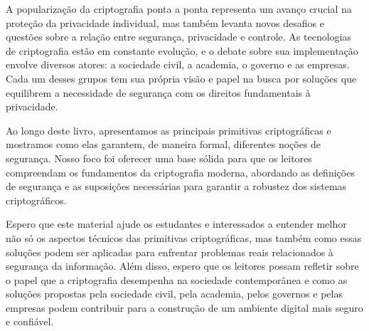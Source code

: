 A popularização da criptografia ponta a ponta representa um avanço crucial na proteção da privacidade individual, mas também levanta novos desafios e questões sobre a relação entre segurança, privacidade e controle.
As tecnologias de criptografia estão em constante evolução, e o debate sobre sua implementação envolve diversos atores: a sociedade civil, a academia, o governo e as empresas.
Cada um desses grupos tem sua própria visão e papel na busca por soluções que equilibrem a necessidade de segurança com os direitos fundamentais à privacidade.


Ao longo deste livro, apresentamos as principais primitivas criptográficas e mostramos como elas garantem, de maneira formal, diferentes noções de segurança.
Nosso foco foi oferecer uma base sólida para que os leitores compreendam os fundamentos da criptografia moderna, abordando as definições de segurança e as suposições necessárias para garantir a robustez dos sistemas criptográficos.

Espero que este material ajude os estudantes e interessados a entender melhor não só os aspectos técnicos das primitivas criptográficas, mas também como essas soluções podem ser aplicadas para enfrentar problemas reais relacionados à segurança da informação.
Além disso, espero que os leitores possam refletir sobre o papel que a criptografia desempenha na sociedade contemporânea e como as soluções propostas pela sociedade civil, pela academia, pelos governos e pelas empresas podem contribuir para a construção de um ambiente digital mais seguro e confiável.



